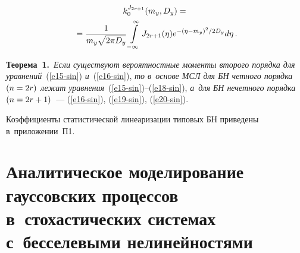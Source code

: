 \begin{multicols}{2}
 \vspace*{-12pt}
 
 \noindent
\begin{multline}
 k_0^{J_{2r+1}}(m_y, D_y) = {}\\
 {}=\displaystyle\frac{\displaystyle 1\mathstrut}{\displaystyle m_y \sqrt{2\pi D_y}\mathstrut} \int\limits_{-\infty}^\infty J_{2r+1} 
 (\eta) e^{-(\eta-m_y)^2/ 2D_y} d\eta\,.
 \label{e20-sin}
 \end{multline}

\noindent
\textbf{Теорема~1.}\ \textit{Если существуют вероятностные моменты второго порядка 
для уравнений}~(\ref{e15-sin}) \textit{и}~(\ref{e16-sin}), 
\textit{то в~основе МСЛ для БН четного порядка $(n\hm=2r)$ 
лежат уравнения}~(\ref{e15-sin})--(\ref{e18-sin}), 
\textit{а~для БН нечетного порядка} $(n\hm=2r+1)$~--- (\ref{e16-sin}), 
(\ref{e19-sin}), (\ref{e20-sin}).

\smallskip

Коэффициенты статистической линеаризации  типовых БН приведены в~приложении~П1.


\section{Аналитическое моделирование гауссовских процессов 
в~стохастических системах с~бесселевыми нелинейностями}


\end{multicols}
